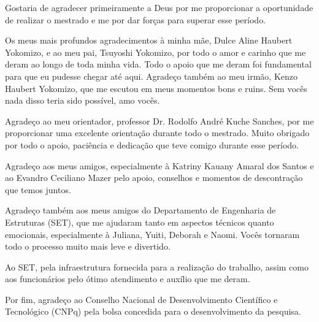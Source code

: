 \begin{agradecimentos}

	Gostaria de agradecer primeiramente a Deus por me proporcionar a oportunidade de realizar o mestrado e me por dar forças para superar esse período.

	Os meus mais profundos agradecimentos à minha mãe, Dulce Aline Haubert Yokomizo, e ao meu pai, Tsuyoshi Yokomizo, por todo o amor e carinho que me deram ao longo de toda minha vida. Todo o apoio que me deram foi fundamental para que eu pudesse chegar até aqui. Agradeço também ao meu irmão, Kenzo Haubert Yokomizo, que me escutou em meus momentos bons e ruins. Sem vocês nada disso teria sido possível, amo vocês.

	Agradeço ao meu orientador, professor Dr. Rodolfo André Kuche Sanches, por me proporcionar uma excelente orientação durante todo o mestrado. Muito obrigado por todo o apoio, paciência e dedicação que teve comigo durante esse período.

	Agradeço aos meus amigos, especialmente à Katriny Kauany Amaral dos Santos e ao Evandro Ceciliano Mazer pelo apoio, conselhos e momentos de descontração que temos juntos.

	Agradeço também aos meus amigos do Departamento de Engenharia de Estruturas (SET), que me ajudaram tanto em aspectos técnicos quanto emocionais, especialmente à Juliana, Yuiti, Deborah e Naomi. Vocês tornaram todo o processo muito mais leve e divertido.

	Ao SET, pela infraestrutura fornecida para a realização do trabalho, assim como aos funcionários pelo ótimo atendimento e auxílio que me deram.

	Por fim, agradeço ao Conselho Nacional de Desenvolvimento Científico e Tecnológico (CNPq) pela bolsa concedida para o desenvolvimento da pesquisa.
\end{agradecimentos}